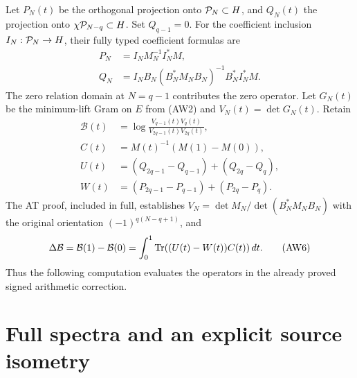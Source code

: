 Let $P_N(t)$ be the orthogonal projection onto $\mathcal P_N\subset H$,
and $Q_N(t)$ the projection onto $\chi\mathcal P_{N-q}\subset H$.
Set $Q_{q-1}=0$. For the coefficient inclusion $I_N:\mathcal P_N\to H$,
their fully typed coefficient formulas are
\[
 \begin{aligned}
 P_N&=I_NM_N^{-1}I_N^*M,\\
 Q_N&=I_NB_N(B_N^*M_NB_N)^{-1}B_N^*I_N^*M.
 \end{aligned}
 \tag{AW4}
\]
The zero relation domain at $N=q-1$ contributes the zero operator.
Let $G_N(t)$ be the minimum-lift Gram on $E$ from (AW2) and
$V_N(t)=\det G_N(t)$. Retain
\[
 \begin{aligned}
 \mathcal B(t)&=\log\frac{V_{q-1}(t)V_q(t)}
                              {V_{2q-1}(t)V_{2q}(t)},\\
 C(t)&=M(t)^{-1}(M(1)-M(0)),\\
 U(t)&=(Q_{2q-1}-Q_{q-1})+(Q_{2q}-Q_q),\\
 W(t)&=(P_{2q-1}-P_{q-1})+(P_{2q}-P_q).
 \end{aligned}
 \tag{AW5}
\]
The AT proof, included in full, establishes
$V_N=\det M_N/\det(B_N^*M_NB_N)$ with the original orientation
$(-1)^{q(N-q+1)}$, and
\[
 \Delta\mathcal B=\mathcal B(1)-\mathcal B(0)
       =\int_0^1\operatorname{Tr}((U(t)-W(t))C(t))\,dt.
 \tag{AW6}
\]
Thus the following computation evaluates the operators in the
already proved signed arithmetic correction.

\section{Full spectra and an explicit source isometry}

